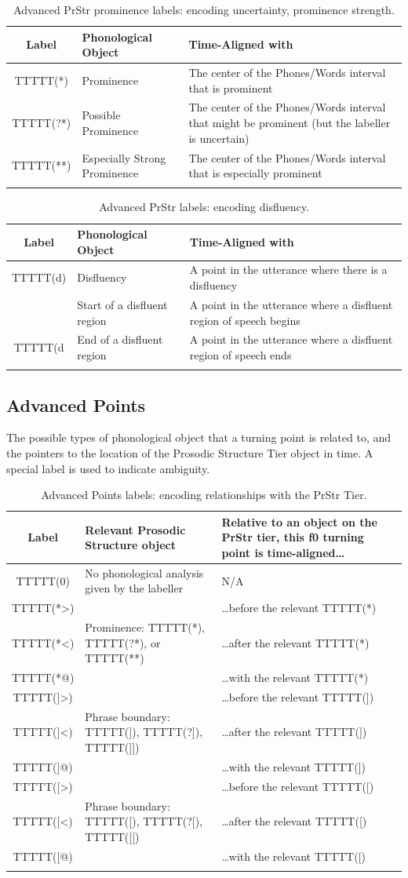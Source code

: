 \documentclass[11pt, twoside]{memoir}
\def\textlabel#1{{\relsize{-.5}\fontspec[Mapping=tex-text]{Roboto Mono}{#1}}}
\begin{document}
\begin{longtable}{cp{.3\linewidth}p{.45\linewidth}}
	\toprule
	\textbf{Label} & \textbf{Phonological Object} & \textbf{Time-Aligned with} \tabularnewline
	\midrule
	\endhead
	\rowcolor{green}
	TTTTT(*) & Prominence & The center of the Phones/Words interval that is prominent\tabularnewline
	TTTTT(?*) & Possible Prominence & The center of the Phones/Words interval that might be prominent (but the labeller is uncertain) \tabularnewline
	TTTTT(**) & Especially Strong Prominence & The center of the Phones/Words interval that is especially prominent \tabularnewline
	\bottomrule
	\caption{Advanced PrStr prominence labels: encoding uncertainty, prominence strength.}
\end{longtable}

\begin{longtable}{cp{.3\linewidth}p{.45\linewidth}}
	\toprule
	\textbf{Label} & \textbf{Phonological Object} & \textbf{Time-Aligned with} \tabularnewline
	\midrule
	\endhead
	TTTTT(d) & Disfluency & A point in the utterance where there is a disfluency\tabularnewline
	\textlabel{\{d} & Start of a disfluent region & A point in the utterance where a disfluent region of speech begins\tabularnewline
	TTTTT(d\)} & End of a disfluent region & A point in the utterance where a disfluent region of speech ends\tabularnewline
	\bottomrule
	\caption{Advanced PrStr labels: encoding disfluency.}
\end{longtable}


\subsection*{Advanced Points}

The possible types of phonological object that a turning point is related to, and the pointers to the location of the Prosodic Structure Tier object in time. A special label is used to indicate ambiguity.

\begin{longtable}{c>{\centering}p{.33\linewidth}>{\centering\arraybackslash}p{.45\linewidth}} \toprule \textbf{Label} & \textbf{Relevant Prosodic Structure object} & \textbf{Relative to an object on the PrStr tier, this f0 turning point is time-aligned…}\tabularnewline
\midrule \endhead
\rowcolor{green}TTTTT(0) & No phonological analysis given by the labeller & N/A\tabularnewline
\midrule
TTTTT(*>) & & …before the relevant TTTTT(*)\tabularnewline
TTTTT(*<) & Prominence: TTTTT(*), TTTTT(?*), or TTTTT(**) & …after the relevant TTTTT(*)\tabularnewline
TTTTT(*@) & & …with the relevant TTTTT(*)\tabularnewline
\midrule
TTTTT(]>) & & …before the relevant TTTTT(])\tabularnewline
TTTTT(]<) & Phrase boundary: TTTTT(]), TTTTT(?]), TTTTT(]]) & …after the relevant TTTTT(])\tabularnewline
TTTTT(]@) & & …with the relevant TTTTT(])\tabularnewline
\midrule
TTTTT([>) & & …before the relevant TTTTT([)\tabularnewline
TTTTT([<) & Phrase boundary: TTTTT([), TTTTT(?[), TTTTT([[) & …after the relevant TTTTT([)\tabularnewline
TTTTT([@) & & …with the relevant TTTTT([)\tabularnewline
\bottomrule
\caption{Advanced Points labels: encoding relationships with the PrStr Tier.}
\end{longtable}
\end{document}
